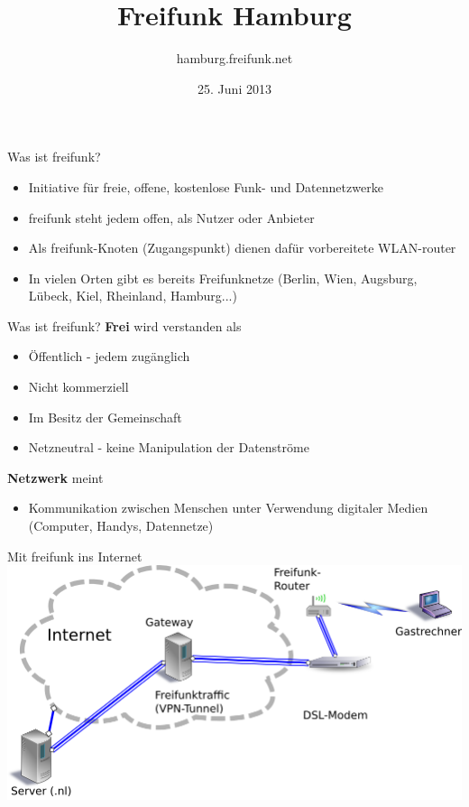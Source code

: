 \documentclass[c]{beamer}
\title{Freifunk Hamburg}
\author{hamburg.freifunk.net}
\date{25. Juni 2013}
\begin{document}
\maketitle

\begin{frame}{Was ist freifunk?}
	\begin{itemize}
		\item Initiative für freie, offene, kostenlose Funk- und Datennetzwerke
		\item freifunk steht jedem offen, als Nutzer oder Anbieter
		\item Als freifunk-Knoten (Zugangspunkt) dienen dafür vorbereitete WLAN-router
		\item In vielen Orten gibt es bereits Freifunknetze (Berlin, Wien, Augsburg, Lübeck, Kiel, Rheinland, Hamburg...)
	\end{itemize}
\end{frame}


\begin{frame}{Was ist freifunk?}
	\textbf{Frei} wird verstanden als
	\begin{itemize}
		\item Öffentlich - jedem zugänglich
		\item Nicht kommerziell
		\item Im Besitz der Gemeinschaft
		\item Netzneutral - keine Manipulation der Datenströme
	\end{itemize}
	\textbf{Netzwerk} meint
	\begin{itemize}
		\item Kommunikation zwischen Menschen unter Verwendung digitaler Medien (Computer, Handys, Datennetze)
	\end{itemize}
\end{frame}


\begin{frame}{Mit freifunk ins Internet}
	\includegraphics[width=\textwidth]{Bilder/Freifunk_Knotenanbindung}
\end{frame}
\end{document}
